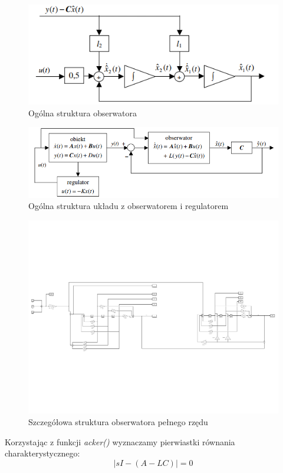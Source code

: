 \documentclass{article}
\begin{document}
\begin{figure}[H]
\centering
\includegraphics[width=0.9\linewidth]{z8obs}
\caption{Ogólna struktura obserwatora}
\label{fig:z8osb}
\end{figure}

\begin{figure}[H]
\centering
\includegraphics[width=0.9\linewidth]{z8reg}
\caption{Ogólna struktura układu z obserwatorem i regulatorem}
\label{fig:z8reg}
\end{figure}

\begin{figure}[H]
\centering
\includegraphics[width=0.9\linewidth]{z8sim}
\caption{Szczegółowa struktura obserwatora pełnego rzędu}
\label{fig:z8sim}
\end{figure}

Korzystając z funkcji \textit{acker()} wyznaczamy pierwiastki równania charakterystycznego:
\[|sI-(A-LC)| = 0\]
\end{document}
